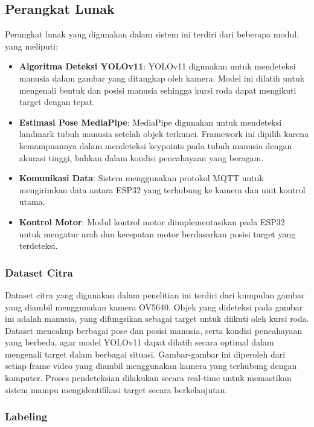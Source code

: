 \subsection{Perangkat Lunak}
\label{subsec:perangkatlunak}

Perangkat lunak yang digunakan dalam sistem ini terdiri dari beberapa modul, yang meliputi:

\begin{itemize}
    \item \textbf{Algoritma Deteksi YOLOv11}: YOLOv11 digunakan untuk mendeteksi manusia dalam gambar yang ditangkap oleh kamera. Model ini dilatih untuk mengenali bentuk dan posisi manusia sehingga kursi roda dapat mengikuti target dengan tepat.
    \item \textbf{Estimasi Pose MediaPipe}: MediaPipe digunakan untuk mendeteksi landmark tubuh manusia setelah objek terkunci. Framework ini dipilih karena kemampuannya dalam mendeteksi keypoints pada tubuh manusia dengan akurasi tinggi, bahkan dalam kondisi pencahayaan yang beragam.
    \item \textbf{Komunikasi Data}: Sistem menggunakan protokol MQTT untuk mengirimkan data antara ESP32 yang terhubung ke kamera dan unit kontrol utama.
    \item \textbf{Kontrol Motor}: Modul kontrol motor diimplementasikan pada ESP32 untuk mengatur arah dan kecepatan motor berdasarkan posisi target yang terdeteksi.
\end{itemize}

\subsubsection{Dataset Citra}
\label{subsubsec:datasetcitra}

Dataset citra yang digunakan dalam penelitian ini terdiri dari kumpulan gambar yang diambil menggunakan kamera OV5640. Objek yang dideteksi pada gambar ini adalah manusia, yang difungsikan sebagai target untuk diikuti oleh kursi roda. Dataset mencakup berbagai pose dan posisi manusia, serta kondisi pencahayaan yang berbeda, agar model YOLOv11 dapat dilatih secara optimal dalam mengenali target dalam berbagai situasi. Gambar-gambar ini diperoleh dari setiap frame video yang diambil menggunakan kamera yang terhubung dengan komputer. Proses pendeteksian dilakukan secara real-time untuk memastikan sistem mampu mengidentifikasi target secara berkelanjutan.

\subsubsection{Labeling}
\label{subsubsec:labeling}

